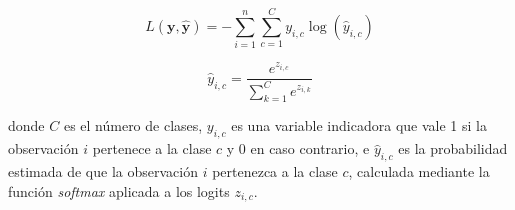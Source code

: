 \begin{equation}
    \label{eq:categorical_cross_entropy}
    L(\mathbf{y}, \hat{\mathbf{y}}) = - \sum_{i=1}^{n} \sum_{c=1}^{C} y_{i,c} \log(\hat{y}_{i,c})
\end{equation}

\begin{equation}
    \label{eq:softmax}
    \hat{y}_{i,c} = \frac{e^{z_{i,c}}}{\sum_{k=1}^{C} e^{z_{i,k}}}
\end{equation}

donde $C$ es el número de clases, $y_{i,c}$ es una variable indicadora que vale 1 si la observación $i$ pertenece a la clase $c$ y 0 en caso contrario, e $\hat{y}_{i,c}$ es la probabilidad estimada de que la observación $i$ pertenezca a la clase $c$, calculada mediante la función \textit{softmax} aplicada a los logits $z_{i,c}$.
